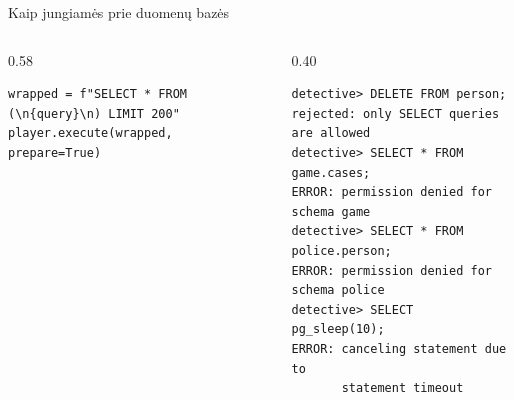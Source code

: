 \documentclass[hyperref={breaklinks=true},fleqn,mathserif]{beamer}
\begin{document}
\begin{frame}[fragile]{Kaip jungiamės prie duomenų bazės}
\begin{columns}[T]
\begin{column}{0.58\textwidth}
\begin{lstlisting}[basicstyle=\ttfamily\fontsize{6.2}{7.4}\selectfont]
wrapped = f"SELECT * FROM (\n{query}\n) LIMIT 200"
player.execute(wrapped, prepare=True)
\end{lstlisting}
\end{column}
\begin{column}{0.40\textwidth}
\begin{lstlisting}[style=term]
detective> DELETE FROM person;
rejected: only SELECT queries are allowed
detective> SELECT * FROM game.cases;
ERROR: permission denied for schema game
detective> SELECT * FROM police.person;
ERROR: permission denied for schema police
detective> SELECT pg_sleep(10);
ERROR: canceling statement due to
       statement timeout
\end{lstlisting}
\end{column}
\end{columns}

\end{frame}
\end{document}
